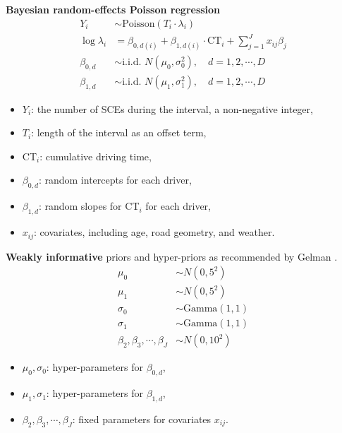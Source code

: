 \documentclass[aspectratio=43]{beamer}
\begin{document}
\begin{frame}{\textbf{Bayesian random-effects Poisson regression}}
\begin{equation}\label{eq:pois}
\begin{split}
Y_{i}  & \sim \text{Poisson}(T_i\cdot\lambda_i)\\
\log\lambda_{i} & =\beta_{0, d(i)} + \beta_{1, d(i)} \cdot \text{CT}_i + \sum_{j=1}^{J} x_{ij}\beta_j\\
\beta_{0, d} &\sim \text{i.i.d. } N(\mu_0, \sigma_0^2), \quad d = 1, 2, \cdots, D\\
\beta_{1, d} &\sim \text{i.i.d. } N(\mu_1, \sigma_1^2), \quad d = 1, 2, \cdots, D
\end{split}
\end{equation}
\begin{itemize}
    \item $Y_i$: the number of SCEs during the interval, a non-negative integer,
    \item $T_i$: length of the interval as an offset term,
    \item CT$_i$: cumulative driving time,
    \item $\beta_{0, d}$: random intercepts for each driver,
    \item $\beta_{1, d}$: random slopes for CT$_i$ for each driver,
    \item $x_{ij}$: covariates, including age, road geometry, and weather.
\end{itemize}
\end{frame}

\begin{frame}
\textbf{Weakly informative} priors and hyper-priors as recommended by Gelman \cite{gelman2017prior}.
\begin{equation}
	\label{eq:prior}
	\begin{split}
		\mu_0 & \sim N(0, 5^2)\\
		\mu_1 & \sim N(0, 5^2)\\
		\sigma_0 & \sim \text{Gamma}(1, 1)\\
		\sigma_1 & \sim \text{Gamma}(1, 1)\\
		\beta_2, \beta_3, \cdots, \beta_J  & \sim N(0, 10^2)
	\end{split}
\end{equation}
\begin{itemize}
    \item $\mu_0, \sigma_0$: hyper-parameters for $\beta_{0, d}$,
    \item $\mu_1, \sigma_1$: hyper-parameters for $\beta_{1, d}$,
    \item $\beta_2, \beta_3, \cdots, \beta_J$: fixed parameters for covariates $x_{ij}$.
\end{itemize}
\end{frame}
\end{document}
